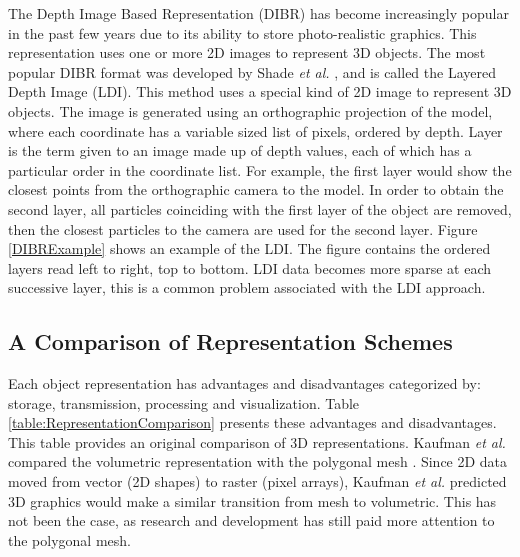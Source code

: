 The Depth Image Based Representation (DIBR) has become increasingly popular in the past few years due to its ability to store photo-realistic graphics. This representation uses one or more 2D images to represent 3D objects. The most popular DIBR format was developed by Shade \textit{et al.} \cite{Shade98Layered}, and is called the Layered Depth Image (LDI). This method uses a special kind of 2D image to represent 3D objects. The image is generated using an orthographic projection of the model, where each coordinate has a variable sized list of pixels, ordered by depth. Layer is the term given to an image made up of depth values, each of which has a particular order in the coordinate list. For example, the first layer would show the closest points from the orthographic camera to the model. In order to obtain the second layer, all particles coinciding with the first layer of the object are removed, then the closest particles to the camera are used for the second layer. Figure \ref{DIBRExample} shows an example of the LDI. The figure contains the ordered layers read left to right, top to bottom. LDI data becomes more sparse at each successive layer, this is a common problem associated with the LDI approach. 

\subsection{A Comparison of Representation Schemes}

Each object representation has advantages and disadvantages categorized by: storage, transmission, processing and visualization. Table \ref{table:RepresentationComparison} presents these advantages and disadvantages. This table provides an original comparison of 3D representations. Kaufman \textit{et al.} compared the volumetric representation with the polygonal mesh \cite{Kaufman93Volume}. Since 2D data moved from vector (2D shapes) to raster (pixel arrays), Kaufman \textit{et al.} predicted 3D graphics would make a similar transition from mesh to volumetric. This has not been the case, as research and development has still paid more attention to the polygonal mesh.


